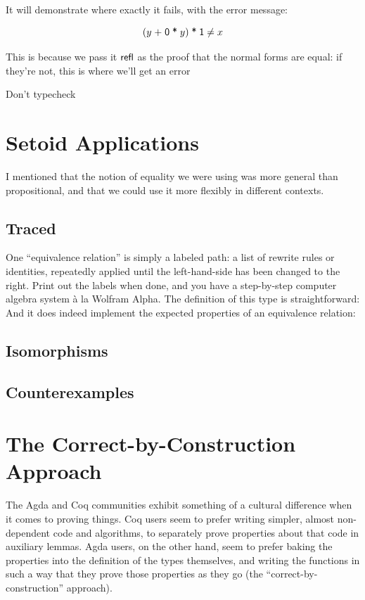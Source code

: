 \documentclass[draft, twocolumn]{article}
\theoremstyle{definition}
\theoremstyle{remark}
\begin{document}

It will demonstrate where exactly it fails, with the error message:

\[
 (y \; \AgdaFunction{+} \; \AgdaNumber{0} \; \AgdaFunction{*} \; y) \;
 \AgdaFunction{*} \;
 \AgdaNumber{1} \neq x
\]

This is because we pass it \(\AgdaField{refl}\) as the proof that the normal
forms are equal: if they're not, this is where we'll get an error

\begin{description}
  \item[Don't typecheck]
\end{description}

\section{Setoid Applications} \label{setoid-applications}
I mentioned that the notion of equality we were using was more general than
propositional, and that we could use it more flexibly in different contexts.
\subsection{Traced}
One ``equivalence relation'' is simply a labeled path: a list of rewrite rules
or identities, repeatedly applied until the left-hand-side has been changed to
the right. Print out the labels when done, and you have a step-by-step computer
algebra system à la Wolfram Alpha. The definition of this type is
straightforward:
And it does indeed implement the expected properties of an equivalence relation:
\subsection{Isomorphisms}
\subsection{Counterexamples}
\section{The Correct-by-Construction Approach} \label{correct-by-constr}
The Agda and Coq communities exhibit something of a cultural difference when it
comes to proving things. Coq users seem to prefer writing simpler, almost
non-dependent code and algorithms, to separately prove properties about that
code in auxiliary lemmas. Agda users, on the other hand, seem to prefer baking
the properties into the definition of the types themselves, and writing the
functions in such a way that they prove those properties as they go (the
``correct-by-construction'' approach).
\end{document}
